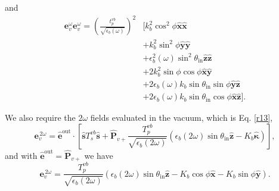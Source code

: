 and
\begin{equation*}
\begin{split}
\mathbf{e}^{\omega}_{v}\mathbf{e}^{\omega}_{v} =
\left(\frac{t^{v b}_{p}}{\sqrt{\epsilon_{b}(\omega)}}\right)^{2}
&\big[
   k^{2}_{b}\cos^{2}\phi\hat{\mathbf{x}}\hat{\mathbf{x}}\\
&+ k^{2}_{b}\sin^{2}\phi\hat{\mathbf{y}}\hat{\mathbf{y}}\\
&+ \epsilon^{2}_{b}(\omega)\sin^{2}\theta_{\mathrm{in}}
   \hat{\mathbf{z}}\hat{\mathbf{z}}\\
&+ 2k^{2}_{b}\sin\phi\cos\phi\hat{\mathbf{x}}\hat{\mathbf{y}}\\
&+ 2\epsilon_{b}(\omega)k_{b}\sin\theta_{\mathrm{in}}\sin\phi
   \hat{\mathbf{y}}\hat{\mathbf{z}}\\
&+ 2\epsilon_{b}(\omega)k_{b}\sin\theta_{\mathrm{in}}\cos\phi
   \hat{\mathbf{x}}\hat{\mathbf{z}}
\big].
\end{split}
\end{equation*}

We also require the $2\omega$ fields evaluated in the vacuum, which is Eq.
\eqref{r13},
\begin{equation}
\mathbf{e}^{\,2\omega}_{v} = \hat{\mathbf{e}}^{\mathrm{out}}
\cdot\left[
\hat{\mathbf{s}}T_s^{v b}\hat{\mathbf{s}} + \hat{\mathbf{P}}_{v+}
\frac{T^{v b}_{p}}{\sqrt{\epsilon_{b}(2\omega)}}
\left(
  \epsilon_{b}(2\omega)\sin\theta_{\mathrm{in}}\hat{\mathbf{z}}
  - K_{b}\hat{\boldsymbol{\kappa}}
\right) 
\right],
\end{equation}
and with $\hat{\mathbf{e}}^{\mathrm{out}} = \hat{\mathbf{P}}_{v+}$ we have
\begin{equation}
\mathbf{e}^{\,2\omega}_{v} =
\frac{T^{v b}_{p}}{\sqrt{\epsilon_{b}(2\omega)}}
\left(
\epsilon_{b}(2\omega)\sin\theta_{\mathrm{in}}\hat{\mathbf{z}}
- K_{b}\cos\phi\hat{\mathbf{x}}
- K_{b}\sin\phi\hat{\mathbf{y}}
\right).
\end{equation}

